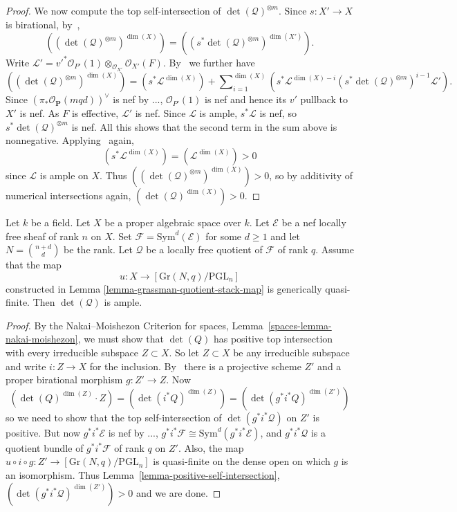 \begin{proof}
We now compute the top self-intersection of $\det(\mathcal{Q})^{\otimes m}$.
Since $s : X' \to X$ is birational, by~,
$$
  ((\det(\mathcal{Q})^{\otimes m})^{\dim(X)})
    = ((s^*\det(\mathcal{Q})^{\otimes m})^{\dim(X')}).
$$
Write
$\mathcal{L}'
  = v'^*\mathcal{O}_{P'}(1) \otimes_{\mathcal{O}_{X'}} \mathcal{O}_{X'}(F)$.
By~ we further have
$$
  ((\det(\mathcal{Q})^{\otimes m})^{\dim(X)})
    = (s^*\mathcal{L}^{\dim(X)})
      + \sum\nolimits_{i = 1}^{\dim(X)}
          (s^*\mathcal{L}^{\dim(X) - i} (s^*\det(\mathcal{Q})^{\otimes m})^{i - 1} \mathcal{L}').
$$
Since $(\pi_*\mathcal{O}_{\mathbf{P}}(mqd))^\vee$ is nef by
...,
$\mathcal{O}_{P'}(1)$ is nef and hence its $v'$ pullback to $X'$ is nef.
As $F$ is effective, $\mathcal{L}'$ is nef.
Since $\mathcal{L}$ is ample, $s^*\mathcal{L}$ is nef, so
$s^*\det(\mathcal{Q})^{\otimes m}$ is nef.
All this shows that the second term in the sum above is nonnegative.
Applying~ again,
$$
  (s^*\mathcal{L}^{\dim(X)}) = (\mathcal{L}^{\dim(X)}) > 0
$$
since $\mathcal{L}$ is ample on $X$.
Thus $((\det(\mathcal{Q})^{\otimes m})^{\dim(X)}) > 0$, so by additivity of
numerical intersections again, $(\det(\mathcal{Q})^{\dim(X)}) > 0$.
\end{proof}

\begin{lemma}
\label{lemma-ampleness-of-semipos-quotients}
Let $k$ be a field.
Let $X$ be a proper algebraic space over $k$.
Let $\mathcal{E}$ be a nef locally free sheaf of rank $n$ on $X$.
Set $\mathcal{F} = \mathrm{Sym}^d(\mathcal{E})$ for some $d \geq 1$ and
let $N = \binom{n + d}{d}$ be the rank.
Let $\mathcal{Q}$ be a locally free quotient of $\mathcal{F}$ of rank $q$.
Assume that the map
$$
u : X \to [\mathrm{Gr}(N,q)/\mathrm{PGL}_n]
$$
constructed in Lemma \ref{lemma-grassman-quotient-stack-map}
is generically quasi-finite.
Then $\det(\mathcal{Q})$ is ample.
\end{lemma}

\begin{proof}
By the Nakai--Moishezon Criterion for spaces,
Lemma~\ref{spaces-lemma-nakai-moishezon},
we must show that $\det(Q)$ has positive top intersection with every
irreducible subspace $Z \subset X$.
So let $Z \subset X$ be any irreducible subspace and write $i : Z \to X$ for
the inclusion.
By~ there is a projective scheme $Z'$ and a proper birational
morphism $g : Z' \to Z$.
Now
$$
  (\det(Q)^{\dim(Z)} \cdot Z)
    = (\det(i^*Q)^{\dim(Z)})
    = (\det(g^*i^*Q)^{\dim(Z')})
$$
so we need to show that the top self-intersection of $\det(g^*i^*\mathcal{Q})$
on $Z'$ is positive.
But now $g^*i^*\mathcal{E}$ is nef by ...,
$g^*i^*\mathcal{F} \cong \mathrm{Sym}^d(g^*i^*\mathcal{E})$,
and $g^*i^*\mathcal{Q}$ is a quotient bundle of $g^*i^*\mathcal{F}$ of rank $q$
on $Z'$.
Also, the map $u \circ i \circ g : Z' \to [\mathrm{Gr}(N,q)/\mathrm{PGL}_n]$
is quasi-finite on the dense open on which $g$ is an isomorphism.
Thus Lemma~\ref{lemma-positive-self-intersection},
$(\det(g^*i^*\mathcal{Q})^{\dim(Z')}) > 0$ and we are done.
\end{proof}


